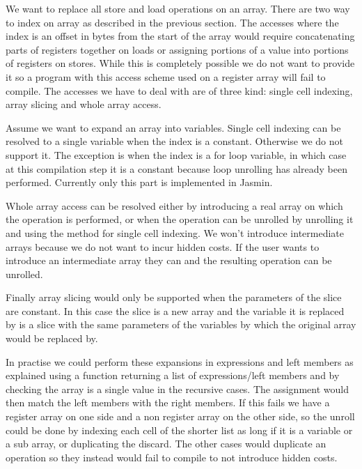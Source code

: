 \documentclass{article}
\begin{document}
\medskip

We want to replace all store and load operations on an array. There are two way
to index on array as described in the previous section. The accesses where the
index is an offset in bytes from the start of the array would require
concatenating parts of registers together on loads or assigning portions of a
value into portions of registers on stores. While this is completely possible we
do not want to provide it so a program with this access scheme used on a
register array will fail to compile.
The accesses we have to deal with are of three kind: single cell indexing,
array slicing and whole array access.

\smallskip

Assume we want to expand an array into variables. Single cell indexing can be
resolved to a single variable when the index is a constant. Otherwise we do not
support it. The exception is when the index is a for loop variable, in which
case at this compilation step it is a constant because loop unrolling has
already been performed.
Currently only this part is implemented in Jasmin.

Whole array access can be resolved either by introducing a real array on which
the operation is performed, or when the operation can be unrolled by unrolling
it and using the method for single cell indexing. We won't introduce
intermediate arrays because we do not want to incur hidden costs. If the user
wants to introduce an intermediate array they can and the resulting operation
can be unrolled.

Finally array slicing would only be supported when the parameters of the slice
are constant. In this case the slice is a new array and the variable it is
replaced by is a slice with the same parameters of the variables by which the
original array would be replaced by.

\smallskip

In practise we could perform these expansions in expressions and left members
as explained using a function returning a list of expressions/left members and
by checking the array is a single value in the recursive cases. The assignment
would then match the left members with the right members. If this fails we have
a register array on one side and a non register array on the other side, so the
unroll could be done by indexing each cell of the shorter list as long if it is
a variable or a sub array, or duplicating the discard. The other cases would
duplicate an operation so they instead would fail to compile to not introduce
hidden costs.
\end{document}
